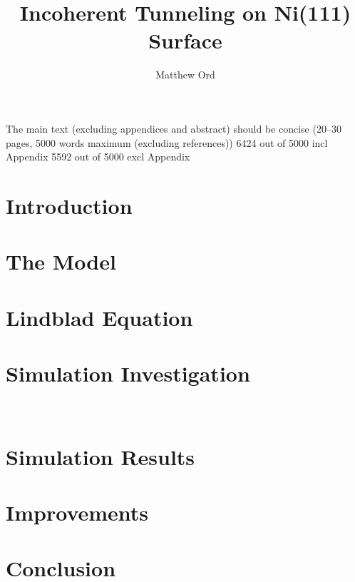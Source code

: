 \documentclass{article}
\title{Incoherent Tunneling on Ni(111) Surface} %
\author{Matthew Ord}
\date{}
\begin{document}
\maketitle
The main text (excluding appendices and abstract) should be concise (20–30 pages, 5000 words maximum (excluding references))
6424 out of 5000 incl Appendix
5592 out of 5000 excl Appendix

\begin{abstract}
    
\end{abstract}

\pagebreak
\section{Introduction}


\pagebreak

\section{The Model}\label{sec:the model}


\section{Lindblad Equation}\label{sec:redfield}


\section{Simulation Investigation}\label{sec:simulation}


\FloatBarrier\
\section{Simulation Results}\label{sec:simulation results}


\section{Improvements}\label{sec:improvements}


\pagebreak

\section{Conclusion}\label{sec:conclusion}

\end{document}
